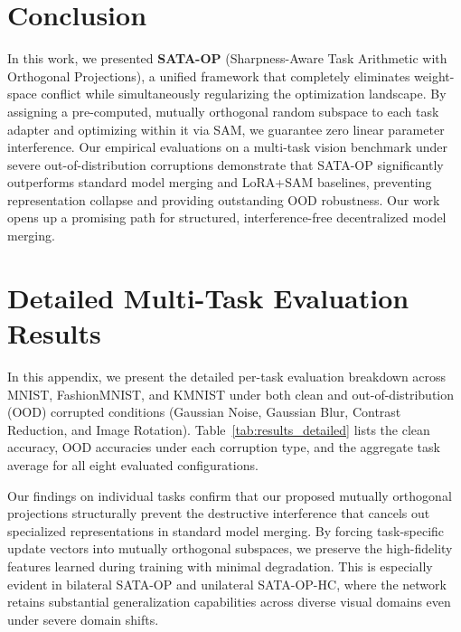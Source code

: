 \documentclass{article}
\theoremstyle{plain}
\theoremstyle{definition}
\theoremstyle{remark}
\begin{document}
\section{Conclusion}
\label{sec:conclusion}

In this work, we presented \textbf{SATA-OP} (Sharpness-Aware Task Arithmetic with Orthogonal Projections), a unified framework that completely eliminates weight-space conflict while simultaneously regularizing the optimization landscape. By assigning a pre-computed, mutually orthogonal random subspace to each task adapter and optimizing within it via SAM, we guarantee zero linear parameter interference. Our empirical evaluations on a multi-task vision benchmark under severe out-of-distribution corruptions demonstrate that SATA-OP significantly outperforms standard model merging and LoRA+SAM baselines, preventing representation collapse and providing outstanding OOD robustness. Our work opens up a promising path for structured, interference-free decentralized model merging.




\newpage
\appendix
\onecolumn
\section{Detailed Multi-Task Evaluation Results}
\label{sec:appendix_results}

In this appendix, we present the detailed per-task evaluation breakdown across MNIST, FashionMNIST, and KMNIST under both clean and out-of-distribution (OOD) corrupted conditions (Gaussian Noise, Gaussian Blur, Contrast Reduction, and Image Rotation). Table~\ref{tab:results_detailed} lists the clean accuracy, OOD accuracies under each corruption type, and the aggregate task average for all eight evaluated configurations. 

Our findings on individual tasks confirm that our proposed mutually orthogonal projections structurally prevent the destructive interference that cancels out specialized representations in standard model merging. By forcing task-specific update vectors into mutually orthogonal subspaces, we preserve the high-fidelity features learned during training with minimal degradation. This is especially evident in bilateral SATA-OP and unilateral SATA-OP-HC, where the network retains substantial generalization capabilities across diverse visual domains even under severe domain shifts.
\end{document}
